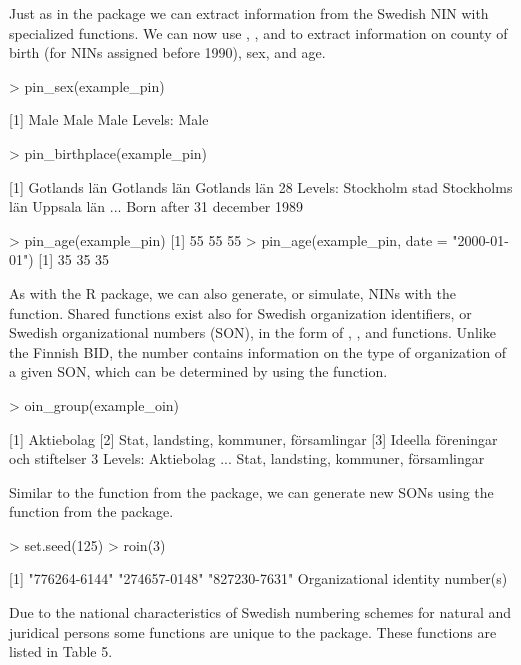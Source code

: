 Just as in the  package we can extract information from the Swedish NIN with specialized functions. We can now use , , and  to extract information on county of birth (for NINs assigned before 1990), sex, and age.

\begin{example}
  > pin_sex(example_pin)
   
  [1] Male Male Male
  Levels: Male

  > pin_birthplace(example_pin)
   
  [1] Gotlands län Gotlands län Gotlands län
  28 Levels: Stockholm stad Stockholms län Uppsala län ... Born after 31 december 1989

  > pin_age(example_pin)
  [1] 55 55 55
  > pin_age(example_pin, date = "2000-01-01")
  [1] 35 35 35
\end{example}

As with the  R package, we can also generate, or simulate, NINs with the  function. Shared functions exist also for Swedish organization identifiers, or Swedish organizational numbers (SON), in the form of , , and  functions. Unlike the Finnish BID, the  number contains information on the type of organization of a given SON, which can be determined by using the  function.

\begin{example}
  > oin_group(example_oin)

  [1] Aktiebolag
  [2] Stat, landsting, kommuner, församlingar
  [3] Ideella föreningar och stiftelser
  3 Levels: Aktiebolag ... Stat, landsting, kommuner, församlingar
\end{example}

Similar to the  function from the  package, we can generate new SONs using the  function from the  package.

\begin{example}
  > set.seed(125)
  > roin(3)

  [1] "776264-6144" "274657-0148" "827230-7631"
  Organizational identity number(s)
\end{example}

Due to the national characteristics of Swedish numbering schemes for natural and juridical persons some functions are unique to the  package. These functions are listed in Table 5.

